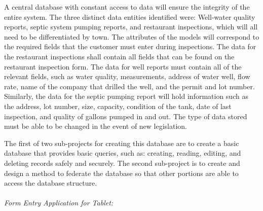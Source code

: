 \documentclass[twoside,letterpaper]{article}
\begin{document}
{A central database with constant access to data will ensure the integrity of the entire system. The three distinct data entities identified were: Well-water quality reports, septic system pumping reports, and restaurant inspections, which will all need to be differentiated by town. The attributes of the models will correspond to the required fields that the customer must enter during inspections. The data for the restaurant inspections shall contain all fields that can be found on the restaurant inspection form. The data for well reports must contain all of the relevant fields, such as water quality, measurements, address of water well, flow rate, name of the company that drilled the well, and the permit and lot number. Similarly, the data for the septic pumping report will hold information such as the address, lot number, size, capacity, condition of the tank, date of last inspection, and quality of gallons pumped in and out.  The type of data stored must be able to be changed in the event of new legislation.
\newline

The first of two sub-projects for creating this database are to create a basic database that provides basic queries, such as: creating, reading, editing, and deleting records safely and securely. The second sub-project is to create and design a method to federate the database so that other portions are able to access the database structure.
\\  \\
\textit{Form Entry Application for Tablet:}
\newline

}
\end{document}
